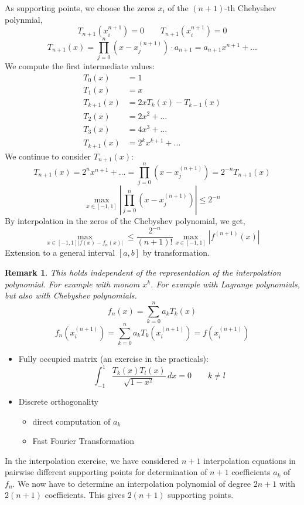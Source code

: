 \documentclass{article}
\newtheorem*{remark}{Remark}
\newcommand{\card}[1]{\left|#1\right|}
\begin{document}
As supporting points, we choose the zeros $x_i$ of the $(n+1)$-th Chebyshev polynmial,
\[ T_{n+1}(x_i^{n+1}) = 0 \qquad T_{n+1}(x_i^{n+1}) = 0 \]
\[ T_{n+1}(x) = \prod_{j=0}^{n} (x - x_j^{(n+1)}) \cdot a_{n+1} = a_{n+1} x^{n+1} + \dots \]
We compute the first intermediate values:
\begin{align*}
  T_0(x) &= 1 \\
  T_1(x) &= x \\
  T_{k+1}(x) &= 2x T_k(x) - T_{k-1}(x) \\
  T_2(x) &= 2x^2 + \dots \\
  T_3(x) &= 4x^3 + \dots \\
  T_{k+1}(x) &= 2^k x^{k+1} + \dots
\end{align*}
We continue to consider $T_{n+1}(x)$:
\[ T_{n+1}(x) = 2^n x^{n+1} + \dots = \prod_{j=0}^n (x - x_j^{(n+1)}) = 2^{-n} T_{n+1}(x) \]
\[ \max_{x \in [-1,1]} \card{\prod_{j=0}^n (x - x_j^{(n+1)})} \leq 2^{-n} \]
By interpolation in the zeros of the Chebyshev polynomial, we get,
\[ \max_{x \in [-1, 1] \card{f(x) - f_n(x)}} \leq \frac{2^{-n}}{(n+1)!} \max_{x \in [-1,1]} \card{f^{(n+1)}(x)} \]
Extension to a general interval $[a,b]$ by transformation.

\begin{remark}
  This holds independent of the representation of the interpolation polynomial. For example with monom $x^k$. For example with Lagrange polynomials, but also with Chebyshev polynomials.
  \[ f_n(x) = \sum_{k=0}^n a_k T_k(x) \]
  \[ f_n(x_i^{(n+1)}) = \sum_{k=0}^n a_k T_k(x_i^{(n+1)}) = f(x_i^{(n+1)}) \]
\end{remark}

\begin{itemize}
  \item Fully occupied matrix (an exercise in the practicals):
    \[ \int_{-1}^1 \frac{T_k(x) T_l(x)}{\sqrt{1 - x^2}} \, dx = 0 \qquad k \neq l \]
  \item Discrete orthogonality
    \begin{itemize}
      \item direct computation of $a_k$
      \item Fast Fourier Transformation
    \end{itemize}
\end{itemize}

In the interpolation exercise, we have considered $n+1$ interpolation equations in pairwise different supporting points for determination of $n+1$ coefficients $a_k$ of $f_n$. We now have to determine an interpolation polynomial of degree $2n+1$ with $2(n+1)$ coefficients.
This gives $2(n+1)$ supporting points.
\end{document}
